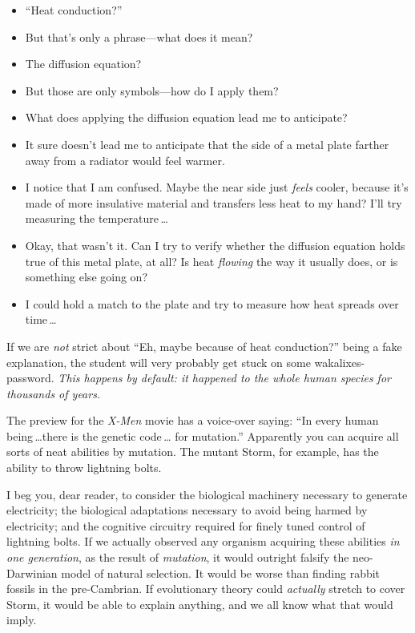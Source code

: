 \begin{itemize}
\item {
 ``Heat conduction?''}

\item {
 But that's only a phrase---what does it mean?}

\item {
 The diffusion equation?}

\item {
 But those are only symbols---how do I apply them?}

\item {
 What does applying the diffusion equation lead me to anticipate?}

\item {
 It sure doesn't lead me to anticipate that the
side of a metal plate farther away from a radiator would feel warmer.}

\item {
 I notice that I am confused. Maybe the near side just
\textit{feels} cooler, because it's made of more
insulative material and transfers less heat to my hand?
I'll try measuring the temperature\,\ldots}

\item {
 Okay, that wasn't it. Can I try to verify whether
the diffusion equation holds true of this metal plate, at all? Is heat
\textit{flowing} the way it usually does, or is something else going
on?}

\item {
 I could hold a match to the plate and try to measure how heat
 spreads over time\,\ldots}
\end{itemize}

{
 If we are \textit{not} strict about ``Eh, maybe
because of heat conduction?'' being a fake
explanation, the student will very probably get stuck on some
wakalixes-password. \textit{This happens by default: it happened to the
whole human species for thousands of years.}}

\myendsectiontext


{
 The preview for the \textit{X-Men} movie has a voice-over saying:
 ``In every human being\,\ldots there is the genetic code\,\ldots
 for mutation.'' Apparently you can acquire all
sorts of neat abilities by mutation. The mutant Storm, for example, has
the ability to throw lightning bolts.}

{
 I beg you, dear reader, to consider the biological machinery
necessary to generate electricity; the biological adaptations necessary
to avoid being harmed by electricity; and the cognitive circuitry
required for finely tuned control of lightning bolts. If we actually
observed any organism acquiring these abilities \textit{in one
generation}, as the result of \textit{mutation}, it would outright
falsify the neo-Darwinian model of natural selection. It would be worse
than finding rabbit fossils in the pre-Cambrian. If evolutionary theory
could \textit{actually} stretch to cover Storm, it would be able to
explain anything, and we all know what that would imply.}

